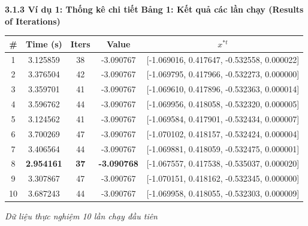 \begin{frame}{\textbf{\large 3.1.3 Ví dụ 1: Thống kê chi tiết}}
    \vspace*{-1cm}
    \textbf{Bảng 1: Kết quả các lần chạy (Results of Iterations)}
    
    \begin{table}[]
        \centering
        \footnotesize 
        \renewcommand{\arraystretch}{1.2} 
        \setlength{\tabcolsep}{5pt} %
        \begin{tabular}{|c|c|c|c|l|}
        \hline
        \textbf{\#} & \textbf{Time (s)} & \textbf{Iters} & \textbf{Value} & \multicolumn{1}{c|}{\textbf{$x^{*t}$}} \\ \hline
        1 & 3.125859 & 38 & -3.090767 & [-1.069016, 0.417647, -0.532558, 0.000022] \\
        2 & 3.376504 & 42 & -3.090767 & [-1.069795, 0.417966, -0.532273, 0.000000] \\
        3 & 3.359701 & 41 & -3.090767 & [-1.069610, 0.417896, -0.532363, 0.000014] \\
        4 & 3.596762 & 44 & -3.090767 & [-1.069956, 0.418058, -0.532320, 0.000005] \\
        5 & 3.124562 & 41 & -3.090767 & [-1.069584, 0.417901, -0.532434, 0.000007] \\
        6 & 3.700269 & 47 & -3.090767 & [-1.070102, 0.418157, -0.532424, 0.000004] \\
        7 & 3.406564 & 44 & -3.090767 & [-1.069881, 0.418059, -0.532475, 0.000001] \\
        8 & \textbf{2.954161} & \textbf{37} & \textbf{-3.090768} & [-1.067557, 0.417538, -0.535037, 0.000020] \\
        9 & 3.307867 & 47 & -3.090767 & [-1.070151, 0.418162, -0.532345, 0.000000] \\
        10 & 3.687243 & 44 & -3.090767 & [-1.069958, 0.418055, -0.532303, 0.000009] \\ \hline
        \end{tabular}
    \end{table}
    
    \footnotesize \centering
    \textit{ Dữ liệu thực nghiệm 10 lần chạy đầu tiên}
\end{frame}


